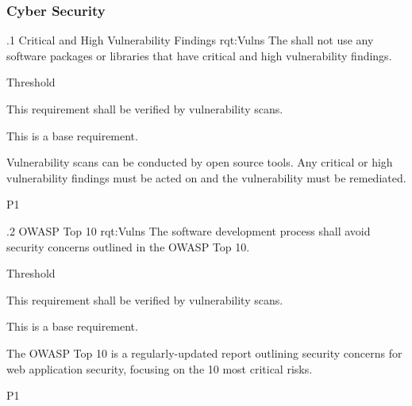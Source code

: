 \subsubsection{Cyber Security}
\label{sssec_Cyber_Security}

\ONERQMTV
{\RqtNumberBase.1}
{Critical and High Vulnerability Findings}
{rqt:Vulns}
{The \ThisSystem shall not use any software packages or libraries that have critical and high vulnerability findings.}
{
	\item [All Phases] Threshold
}
{This requirement shall be verified by vulnerability scans.}
{
\item [N/A] This is a base requirement.
}
{
	\item Vulnerability scans can be conducted by open source tools. Any critical or high vulnerability findings must be acted on and the vulnerability must be remediated.
}
{P1}

\ONERQMTV
{\RqtNumberBase.2}
{OWASP Top 10}
{rqt:Vulns}
{The \ThisSystem software development process shall avoid security concerns outlined in the OWASP Top 10.}
{
	\item [All Phases] Threshold
}
{This requirement shall be verified by vulnerability scans.}
{
\item [N/A] This is a base requirement.
}
{
	\item The OWASP Top 10 is a regularly-updated report outlining security concerns for web application security, focusing on the 10 most critical risks.
}
{P1}
